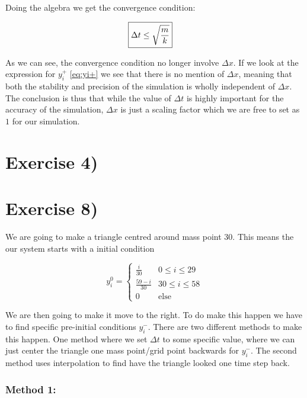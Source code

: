 \documentclass[a4paper,norsk, 10pt]{article}
\begin{document}
Doing the algebra we get the convergence condition:

\begin{align}
\Aboxed{
\Delta t \leq \sqrt{\frac{m}{k}}
}
\label{eq:maxDt}
\end{align}

As we can see, the convergence condition no longer involve $\Delta x$. If we look at the expression for $y_i^+$ \eqref{eq:yi+} we see that there is no mention of $\Delta x$, meaning that both the stability and precision of the simulation is wholly independent of $\Delta x$.\\

The conclusion is thus that while the value of $\Delta t$ is highly important for the accuracy of the simulation, $\Delta x$ is just a scaling factor which we are free to set as $1$ for our simulation.

\newpage


\section{Exercise 4)}


\section{Exercise 8)}
We are going to make a triangle centred around mass point 30. This means the our system starts with a initial condition

\begin{equation}
y_i^0 =
\begin{cases}
\frac{i}{30} & 0 \leq i \leq 29\\
\frac{59-i}{30} & 30 \leq i \leq 58\\
0 & \text{else}
\end{cases}
\end{equation}

We are then going to make it move to the right. To do make this happen we have to find specific pre-initial conditions $y_i^-$. There are two different methods to make this happen. One method where we set $\Delta t$ to some specific value, where we can just center the triangle one mass point/grid point backwards for $y_i^-$. The second method uses interpolation to find have the triangle looked one time step back.

\subsubsection*{Method 1:}
\end{document}

